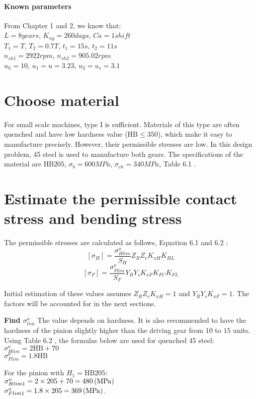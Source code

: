 \paragraph{Known parameters} From Chapter 1 and 2, we know that:\\
$ L=8\unit{years} $, $ K_{ng}=260\unit{days} $, $ Ca=1\unit{shift} $\\
$ T_1=T$, $T_2=0.7T$, $ t_1=15\unit{s}$, $t_2=11\unit{s} $\\
$ n_{sh1}=2922\unit{rpm} $, $ n_{sh2}=905.02\unit{rpm} $\\
$ u_h=10 $, $ u_1 =u=3.23$, $ u_2=u_s=3.1 $

\section{Choose material}
For small scale machines, type I is sufficient. Materials of this type  are often quenched and have low hardness value ($ \text{HB}\leq 350 $), which make it easy to manufacture precisely.  However, their permissible stresses are low. In this design problem, 45 steel  is used to manufacture both gears.  The specifications of the material are $ \text{HB} 205 $, $ \sigma_b = 600\unit{MPa} $, $ \sigma_{ch} = 340 \unit{MPa}$, Table 6.1  \cite{tk1}.

\section{Estimate the permissible contact stress and bending stress}
The permissible stresses are calculated as follows, Equation 6.1 and 6.2 \cite{tk1}:
\[[\sigma_H]=\dfrac{\sigma_{Hlim}^o}{S_H}Z_RZ_vK_{xH}K_{HL}\]
\[[\sigma_{F}]=\dfrac{\sigma_{Flim}^o}{S_F}Y_RY_sK_{xF}K_{FC}K_{FL}\]

Initial estimation of these values assumes $ Z_RZ_vK_{xH} = 1 $ and $ Y_RY_sK_{xF} = 1 $. The factors will be accounted for in the next sections.

\textbf{Find $ \sigma_{lim}^o $} The value depends on hardness. It is also recommended to have the hardness of the pinion slightly higher than the driving gear from $ 10 $ to $ 15 $ units. Using Table 6.2 \cite{tk1}, the formulas below are used for quenched 45 steel:\\
$ \sigma_{Hlim}^o = 2\text{HB} + 70$\\
$ \sigma_{Flim}^o = 1.8\text{HB} $

For the pinion with $ H_1=\text{HB}205$:\\
$ \sigma_{Hlim1}^o = 2 \times 205 + 70 = 480 \, (\mathrm{MPa})$\\
$ \sigma_{Flim1}^o = 1.8\times 205 = 369 \, (\mathrm{MPa})$.

